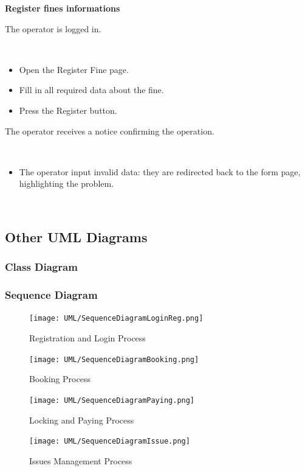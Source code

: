 \documentclass[11pt]{article} %
\begin{document}
\begin{description}[noitemsep,topsep=0pt,parsep=0pt,partopsep=0pt]
	\item[Name:] \textbf{Register fines informations}
	\item[Entry Conditions:] The operator is logged in.
	\item[Flow Of Events:] \hfill\
	\begin{itemize}
		\item Open the Register Fine page.
		\item Fill in all required data about the fine.
		\item Press the Register button.
	\end{itemize}
	\item[Exit conditions:]  The operator receives a notice confirming the operation.
	\item[Exceptions:] \hfill\
	\begin{itemize}
		\item The operator input invalid data: they are redirected back to the form page, highlighting the problem.
	\end{itemize}
\end{description}
\hfill\

\subsection{Other UML Diagrams}
\subsubsection{Class Diagram}
\subsubsection{Sequence Diagram}
\begin{figure}[H]
	\centering
	\texttt{[image: UML/SequenceDiagramLoginReg.png]}
	\caption{Registration and Login Process}
\end{figure}
\begin{figure}[H]
	\centering
	\texttt{[image: UML/SequenceDiagramBooking.png]}
	\caption{Booking Process}
\end{figure}
\begin{figure}[H]
	\centering
	\texttt{[image: UML/SequenceDiagramPaying.png]}
	\caption{Locking and Paying Process}
\end{figure}
\begin{figure}[H]
	\centering
	\texttt{[image: UML/SequenceDiagramIssue.png]}
	\caption{Issues Management Process}
\end{figure}
\end{document}
